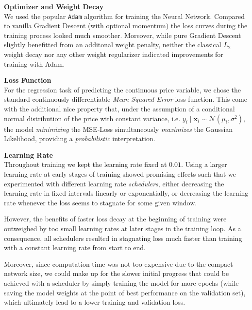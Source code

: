 \documentclass[12pt, letterpaper]{article}
\begin{document}
\textbf{Optimizer and Weight Decay} \\
We used the popular \texttt{Adam} algorithm for training the Neural Network.
Compared to vanilla Gradient Descent (with optional momentum) the loss curves during the training process looked much smoother.
Moreover, while pure Gradient Descent slightly benefitted from an additonal weight penalty, neither the classical $L_2$ weight decay nor any other weight regularizer indicated improvements for training with Adam.

\textbf{Loss Function} \\
For the regression task of predicting the continuous price variable, we chose the standard continuously differentiable \emph{Mean Squared Error} loss function.
This come with the additional nice property that, under the assumption of a conditional normal distribution of the price with constant variance, i.e. $y_i \mid \mathbf{x}_i \sim \mathcal{N} \left(\mu_i, \sigma^2 \right)$, the model \emph{minimizing} the MSE-Loss simultaneously \emph{maximizes} the Gaussian Likelihood, providing a \emph{probabilistic} interpretation.

\textbf{Learning Rate} \\
Throughout training we kept the learning rate fixed at $0.01$.
Using a larger learning rate at early stages of training showed promising effects such that we experimented with different learning rate \emph{schedulers}, either decreasing the learning rate in fixed intervals linearly or exponentially, or decreasing the learning rate whenever the loss seems to stagnate for some given window.

However, the benefits of faster loss decay at the beginning of training were outweighed by too small learning rates at later stages in the training loop.
As a consequence, all schedulers resulted in stagnating loss much faster than training with a constant learning rate from start to end.

Moreover, since computation time was not too expensive due to the compact network size, we could make up for the slower initial progress that could be achieved with a scheduler by simply training the model for more epochs (while saving the model weights at the point of best performance on the validation set), which ultimately lead to a lower training and validation loss.


\newpage




\appendix
\end{document}
